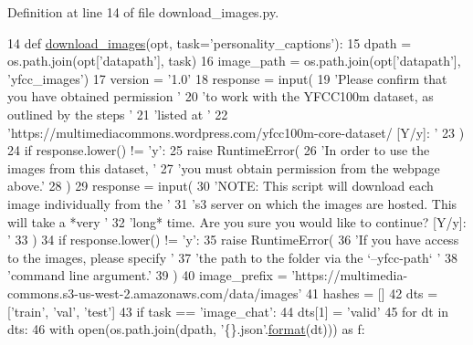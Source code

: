 Definition at line 14 of file download\+\_\+images.\+py.


\begin{DoxyCode}
14 \textcolor{keyword}{def }\hyperlink{namespaceparlai_1_1tasks_1_1personality__captions_1_1download__images_a9d812a095ca6d48541b3d5cdc65a4bf3}{download\_images}(opt, task='personality\_captions'):
15     dpath = os.path.join(opt[\textcolor{stringliteral}{'datapath'}], task)
16     image\_path = os.path.join(opt[\textcolor{stringliteral}{'datapath'}], \textcolor{stringliteral}{'yfcc\_images'})
17     version = \textcolor{stringliteral}{'1.0'}
18     response = input(
19         \textcolor{stringliteral}{'Please confirm that you have obtained permission '}
20         \textcolor{stringliteral}{'to work with the YFCC100m dataset, as outlined by the steps '}
21         \textcolor{stringliteral}{'listed at '}
22         \textcolor{stringliteral}{'https://multimediacommons.wordpress.com/yfcc100m-core-dataset/ [Y/y]: '}
23     )
24     \textcolor{keywordflow}{if} response.lower() != \textcolor{stringliteral}{'y'}:
25         \textcolor{keywordflow}{raise} RuntimeError(
26             \textcolor{stringliteral}{'In order to use the images from this dataset, '}
27             \textcolor{stringliteral}{'you must obtain permission from the webpage above.'}
28         )
29     response = input(
30         \textcolor{stringliteral}{'NOTE: This script will download each image individually from the '}
31         \textcolor{stringliteral}{'s3 server on which the images are hosted. This will take a *very '}
32         \textcolor{stringliteral}{'long* time. Are you sure you would like to continue? [Y/y]: '}
33     )
34     \textcolor{keywordflow}{if} response.lower() != \textcolor{stringliteral}{'y'}:
35         \textcolor{keywordflow}{raise} RuntimeError(
36             \textcolor{stringliteral}{'If you have access to the images, please specify '}
37             \textcolor{stringliteral}{'the path to the folder via the `--yfcc-path` '}
38             \textcolor{stringliteral}{'command line argument.'}
39         )
40     image\_prefix = \textcolor{stringliteral}{'https://multimedia-commons.s3-us-west-2.amazonaws.com/data/images'}
41     hashes = []
42     dts = [\textcolor{stringliteral}{'train'}, \textcolor{stringliteral}{'val'}, \textcolor{stringliteral}{'test'}]
43     \textcolor{keywordflow}{if} task == \textcolor{stringliteral}{'image\_chat'}:
44         dts[1] = \textcolor{stringliteral}{'valid'}
45     \textcolor{keywordflow}{for} dt \textcolor{keywordflow}{in} dts:
46         with open(os.path.join(dpath, \textcolor{stringliteral}{'\{\}.json'}.\hyperlink{namespaceparlai_1_1chat__service_1_1services_1_1messenger_1_1shared__utils_a32e2e2022b824fbaf80c747160b52a76}{format}(dt))) \textcolor{keyword}{as} f:

\end{DoxyCode}
